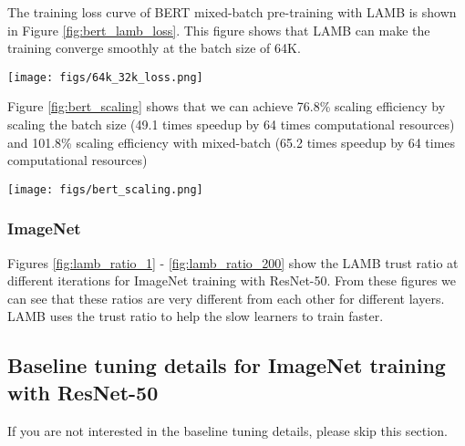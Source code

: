 \documentclass{article} \usepackage{iclr2020_conference,times}
\begin{document}
The training loss curve of BERT mixed-batch pre-training with LAMB is shown in Figure \ref{fig:bert_lamb_loss}.
This figure shows that LAMB can make the training converge smoothly at the batch size of 64K.

\begin{figure*}[tb]
\vspace{5pt}
\centering
\texttt{[image: figs/64k\_32k\_loss.png]}
\caption{This figure shows the training loss curve of LAMB optimizer. This figure shows that LAMB can make the training converge smoothly at the extremely large batch size (e.g. 64K).}
\label{fig:bert_lamb_loss}
\vspace{-10pt}
\end{figure*}

Figure \ref{fig:bert_scaling} shows that we can achieve 76.8\% scaling efficiency by scaling the batch size (49.1 times speedup by 64 times computational resources) and 101.8\% scaling efficiency with mixed-batch (65.2 times speedup by 64 times computational resources)

\begin{figure*}[tb]
\vspace{5pt}
\centering
\texttt{[image: figs/bert\_scaling.png]}
\caption{We achieve 76.8\% scaling efficiency (49 times speedup by 64 times computational resources) and 101.8\% scaling efficiency with a mixed, scaled batch size (65.2 times speedup by 64 times computational resources). 1024-mixed means the mixed-batch training on 1024 TPUs.}
\label{fig:bert_scaling}
\vspace{-10pt}
\end{figure*}





\subsubsection{ImageNet}

Figures \ref{fig:lamb_ratio_1} - \ref{fig:lamb_ratio_200} show the LAMB trust ratio at different iterations for ImageNet training with ResNet-50.
From these figures we can see that these ratios are very different from each other for different layers.
LAMB uses the trust ratio to help the slow learners to train faster.

\subsection{Baseline tuning details for ImageNet training with ResNet-50}
If you are not interested in the baseline tuning details, please skip this section.
\end{document}
